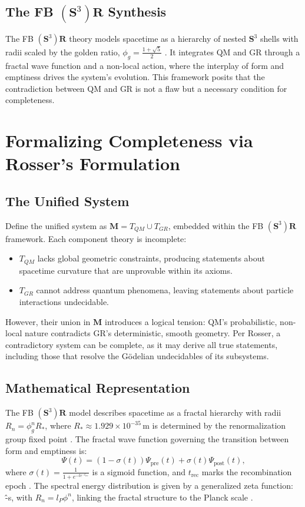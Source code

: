 \documentclass[a4paper,12pt]{article}
\begin{document}
\subsection{The FB $\left(\mathbf{S}^3\right)\mathbf{R}$ Synthesis}
The FB $\left(\mathbf{S}^3\right)\mathbf{R}$ theory models spacetime as a hierarchy of nested $\mathbf{S}^3$ shells with radii scaled by the golden ratio, $\phi_g = \frac{1 + \sqrt{5}}{2}$ \cite{Preece2025a,Preece2025b}. It integrates QM and GR through a fractal wave function and a non-local action, where the interplay of form and emptiness drives the system's evolution. This framework posits that the contradiction between QM and GR is not a flaw but a necessary condition for completeness.

\section{Formalizing Completeness via Rosser's Formulation}

\subsection{The Unified System}
Define the unified system as $\boldsymbol{M} = T_{QM} \cup T_{GR}$, embedded within the FB $\left(\mathbf{S}^3\right)\mathbf{R}$ framework. Each component theory is incomplete:
\begin{itemize}
    \item $T_{QM}$ lacks global geometric constraints, producing statements about spacetime curvature that are unprovable within its axioms.
    \item $T_{GR}$ cannot address quantum phenomena, leaving statements about particle interactions undecidable.
\end{itemize}
However, their union in $\boldsymbol{M}$ introduces a logical tension: QM's probabilistic, non-local nature contradicts GR's deterministic, smooth geometry. Per Rosser, a contradictory system can be complete, as it may derive all true statements, including those that resolve the Gödelian undecidables of its subsystems.

\subsection{Mathematical Representation}
The FB $\left(\mathbf{S}^3\right)\mathbf{R}$ model describes spacetime as a fractal hierarchy with radii $R_n = \phi_g^n R_*$, where $R_* \approx 1.929 \times 10^{-35} \, \text{m}$ is determined by the renormalization group fixed point \cite{Preece2025b}. The fractal wave function governing the transition between form and emptiness is:
\[
\Psi(t) = (1 - \sigma(t)) \Psi_{\text{pre}}(t) + \sigma(t) \Psi_{\text{post}}(t),
\]
where $\sigma(t) = \frac{1}{1 + e^{-t e^{-t_{\text{rec}}}}}$ is a sigmoid function, and $t_{\text{rec}}$ marks the recombination epoch \cite{Preece2025a}. The spectral energy distribution is given by a generalized zeta function:
\^{-s},
\]
with $R_n = l_P \phi^n$, linking the fractal structure to the Planck scale \cite{Preece2025a}.
\end{document}
